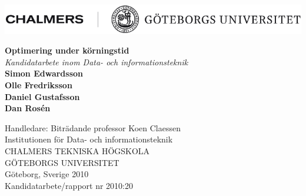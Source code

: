 \documentclass[leqno]{report}
\begin{document}

\begin{titlepage}
\includegraphics[width=\textwidth]{img/logo.png}
\vfill
\begin{flushleft}
{\LARGE \textbf{Optimering under körningstid}}\\[0.25cm]

\emph{Kandidatarbete inom Data- och informationsteknik} \\[1cm]
{\Large 
\textbf{Simon Edwardsson \\
Olle Fredriksson \\
Daniel Gustafsson \\
Dan Rosén \\[1.5cm]
}}

Handledare: Biträdande professor Koen Claessen \\[0.25cm]

Institutionen för Data- och informationsteknik \\[0.5cm]


CHALMERS TEKNISKA HÖGSKOLA \\
GÖTEBORGS UNIVERSITET \\
Göteborg, Sverige 2010 \\
Kandidatarbete/rapport nr 2010:20
\end{flushleft}


\end{titlepage}
\end{document}
